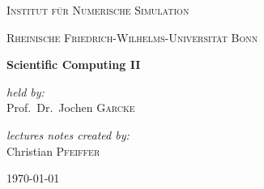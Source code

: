 \documentclass{scrbook}
\begin{document}
\frontmatter

\begin{titlepage}

	\centering

	\par\vspace{2.2cm}
	
	\textsc{\LARGE Institut für Numerische Simulation}\par\vspace{0.3cm}
	\textsc{\small Rheinische Friedrich-Wilhelms-Universität Bonn}\par\vspace{0.9cm}
	
	\vfill

	\begin{mdframed}[rightline=false,linewidth=0.5mm,leftline=false,innerbottommargin=\baselineskip,innertopmargin=\baselineskip]
	\centering\textbf{\huge Scientific Computing II}
	\end{mdframed}
	
	\vspace{1.5cm}
	
	\begin{minipage}{0.4\textwidth}
		\centering\large
		\textit{held by:} \\
		Prof.\ Dr.\ Jochen \textsc{Garcke}
	\end{minipage}
	\vfill
	\vfill
	\vfill
	\vfill
	\begin{minipage}{0.4\textwidth}
		\centering\large
		\textit{lectures notes created by:}\\
		Christian \textsc{Pfeiffer}
	\end{minipage}
	
	\vfill

	{\large \today}

\end{titlepage}

\printacronyms
\tableofcontents

\mainmatter











\backmatter
\printindex[keydefinitions]
\printbibliography[heading=bibintoc]
\end{document}

